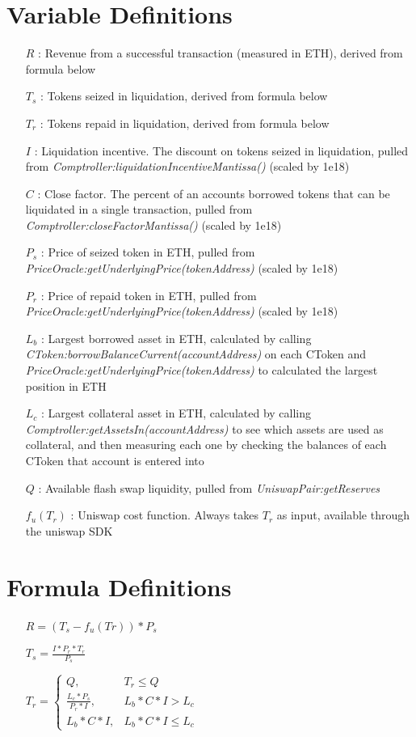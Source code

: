 \documentclass{article}
\begin{document}
  \section*{Variable Definitions}
  \begin{itemize}
    \item[$R$ :] Revenue from a successful transaction (measured in ETH), derived from formula below
    \item[$T_{s}$ :] Tokens seized in liquidation, derived from formula below
    \item[$T_{r}$ :] Tokens repaid in liquidation, derived from formula below
    \item[$I$ :] Liquidation incentive. The discount on tokens seized in liquidation, pulled from \emph{Comptroller:liquidationIncentiveMantissa()} (scaled by 1e18)
    \item[$C$ :] Close factor. The percent of an accounts borrowed tokens that can be liquidated in a single transaction, pulled from \emph{Comptroller:closeFactorMantissa()} (scaled by 1e18)
    \item[$P_{s}$ :] Price of seized token in ETH, pulled from \emph{PriceOracle:getUnderlyingPrice(tokenAddress)} (scaled by 1e18)
    \item[$P_{r}$ :] Price of repaid token in ETH, pulled from \emph{PriceOracle:getUnderlyingPrice(tokenAddress)} (scaled by 1e18)
    \item[$L_{b}$ :] Largest borrowed asset in ETH, calculated by calling \emph{CToken:borrowBalanceCurrent(accountAddress)} on each CToken and \emph{PriceOracle:getUnderlyingPrice(tokenAddress)} to calculated the largest position in ETH
    \item[$L_{c}$ :] Largest collateral asset in ETH, calculated by calling \emph{Comptroller:getAssetsIn(accountAddress)} to see which assets are used as collateral, and then measuring each one by checking the balances of each CToken that account is entered into
    \item[$Q$ :] Available flash swap liquidity, pulled from \emph{UniswapPair:getReserves} 
    \item[$f_{u}(T_{r})$ :] Uniswap cost function. Always takes $T_{r}$ as input, available through the uniswap SDK 
  \end{itemize}

  \section*{Formula Definitions}
  \begin{itemize}
    \item[]{\Large $R = (T_{s} - f_{u}(T{r})) * P_{s}$}
    \item[]{\Large $T_{s} = \frac{I * P_{r} * T_{r}}{P_{s}}$}
    \item[]{\Large $T_{r} = \begin{cases} Q, & T_{r} \leq Q \\\frac{L_{c} * P_{s}}{P_{r} * I}, & L_{b} * C * I > L_{c} \\L_{b} * C * I, & L_{b} * C * I \leq L_{c}\end{cases}$}
  \end{itemize}
\end{document}
